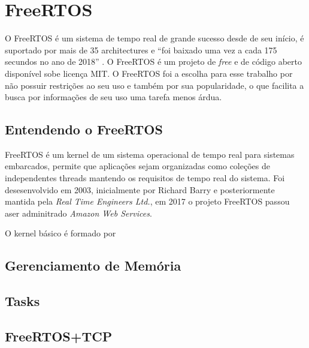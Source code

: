 \chapter{FreeRTOS}


O FreeRTOS é um sistema de tempo real de grande sucesso desde de seu início,
é suportado por mais de 35 architectures e ``foi baixado uma vez a cada 175
secundos no ano de 2018'' \cite{FreeRTOS_history}. O FreeRTOS é um projeto de
\textit{free} e de código aberto disponível sobe licença MIT. O FreeRTOS foi
a escolha para esse trabalho por não possuir restrições ao seu uso e também
por sua popularidade, o que facilita a busca por informações de seu uso uma
tarefa menos árdua.

\section{Entendendo o FreeRTOS}

FreeRTOS é um kernel de um sistema operacional de tempo real para sistemas
embarcados, permite que aplicações sejam organizadas como coleções de 
independentes threads mantendo os requisitos de tempo real do sistema.
Foi desesenvolvido em 2003, inicialmente por Richard Barry e posteriormente
mantida pela \textit{Real Time Engineers Ltd.}, em 2017 o projeto 
FreeRTOS passou aser adminitrado \textit{Amazon Web Services}.

O kernel básico é formado por 

 

\section{Gerenciamento de Memória}

\section{Tasks}


\section{FreeRTOS+TCP}
